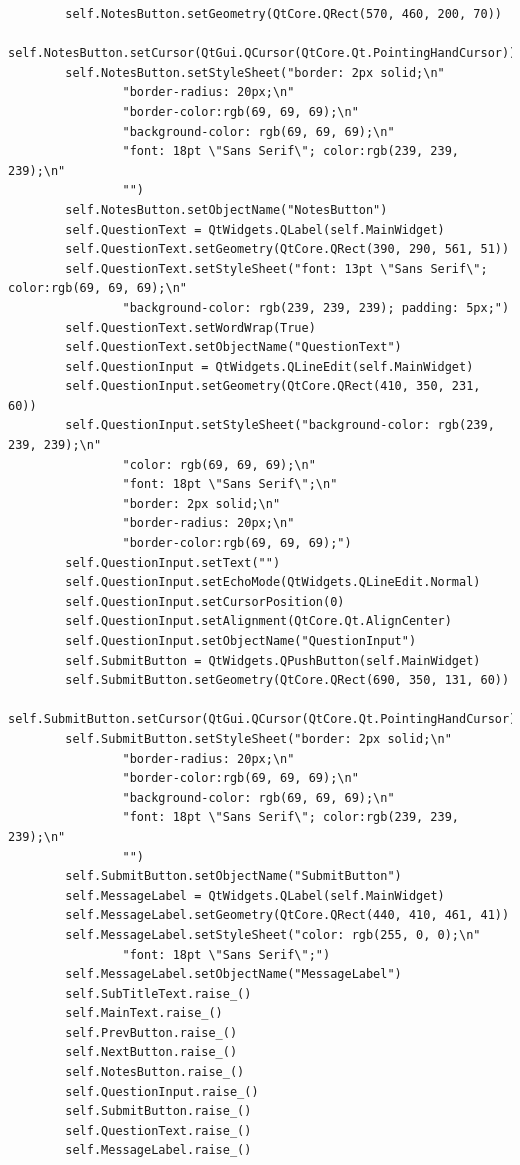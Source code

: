 \documentclass[12pt]{article}
\begin{document}
\begin{lstlisting}
        self.NotesButton.setGeometry(QtCore.QRect(570, 460, 200, 70))
        self.NotesButton.setCursor(QtGui.QCursor(QtCore.Qt.PointingHandCursor))
        self.NotesButton.setStyleSheet("border: 2px solid;\n"
                "border-radius: 20px;\n"
                "border-color:rgb(69, 69, 69);\n"
                "background-color: rgb(69, 69, 69);\n"
                "font: 18pt \"Sans Serif\"; color:rgb(239, 239, 239);\n"
                "")
        self.NotesButton.setObjectName("NotesButton")
        self.QuestionText = QtWidgets.QLabel(self.MainWidget)
        self.QuestionText.setGeometry(QtCore.QRect(390, 290, 561, 51))
        self.QuestionText.setStyleSheet("font: 13pt \"Sans Serif\"; color:rgb(69, 69, 69);\n"
                "background-color: rgb(239, 239, 239); padding: 5px;")
        self.QuestionText.setWordWrap(True)
        self.QuestionText.setObjectName("QuestionText")
        self.QuestionInput = QtWidgets.QLineEdit(self.MainWidget)
        self.QuestionInput.setGeometry(QtCore.QRect(410, 350, 231, 60))
        self.QuestionInput.setStyleSheet("background-color: rgb(239, 239, 239);\n"
                "color: rgb(69, 69, 69);\n"
                "font: 18pt \"Sans Serif\";\n"
                "border: 2px solid;\n"
                "border-radius: 20px;\n"
                "border-color:rgb(69, 69, 69);")
        self.QuestionInput.setText("")
        self.QuestionInput.setEchoMode(QtWidgets.QLineEdit.Normal)
        self.QuestionInput.setCursorPosition(0)
        self.QuestionInput.setAlignment(QtCore.Qt.AlignCenter)
        self.QuestionInput.setObjectName("QuestionInput")
        self.SubmitButton = QtWidgets.QPushButton(self.MainWidget)
        self.SubmitButton.setGeometry(QtCore.QRect(690, 350, 131, 60))
        self.SubmitButton.setCursor(QtGui.QCursor(QtCore.Qt.PointingHandCursor))
        self.SubmitButton.setStyleSheet("border: 2px solid;\n"
                "border-radius: 20px;\n"
                "border-color:rgb(69, 69, 69);\n"
                "background-color: rgb(69, 69, 69);\n"
                "font: 18pt \"Sans Serif\"; color:rgb(239, 239, 239);\n"
                "")
        self.SubmitButton.setObjectName("SubmitButton")
        self.MessageLabel = QtWidgets.QLabel(self.MainWidget)
        self.MessageLabel.setGeometry(QtCore.QRect(440, 410, 461, 41))
        self.MessageLabel.setStyleSheet("color: rgb(255, 0, 0);\n"
                "font: 18pt \"Sans Serif\";")
        self.MessageLabel.setObjectName("MessageLabel")
        self.SubTitleText.raise_()
        self.MainText.raise_()
        self.PrevButton.raise_()
        self.NextButton.raise_()
        self.NotesButton.raise_()
        self.QuestionInput.raise_()
        self.SubmitButton.raise_()
        self.QuestionText.raise_()
        self.MessageLabel.raise_()


\end{lstlisting}
\end{document}
